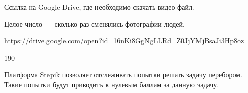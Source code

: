 Ссылка на Google Drive, где необходимо скачать видео-файл.  

\outputfmtSection

Целое число --- сколько раз сменялись фотографии людей.

\exampleSection


\footnotesize
\begin{myverbbox}[\small]{\vinput}
https://drive.google.com/open?id=16nKi8GgNgLLRd_Z0JjYMjBsaJi3Hp8oz
\end{myverbbox}
\begin{myverbbox}[\small]{\voutput}
190
\end{myverbbox}
\normalsize

\commentsSection
Платформа Stepik позволяет отслеживать попытки решать задачу перебором. Такие попытки будут приводить к нулевым баллам за данную задачу.

